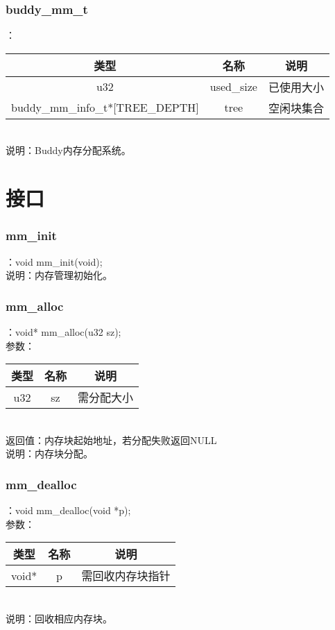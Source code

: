 \subsubsection{buddy\_mm\_t}
：\\
\begin{tabular}{|c|c|c|}
    \hline
    类型 & 名称 & 说明\\\hline
    u32 & used\_size & 已使用大小\\\hline
    buddy\_mm\_info\_t*[TREE\_DEPTH] & tree & 空闲块集合\\\hline
\end{tabular}\\
说明：Buddy内存分配系统。

\section{接口}

\subsubsection{mm\_init}
：void mm\_init(void);\\
说明：内存管理初始化。

\subsubsection{mm\_alloc}
：void* mm\_alloc(u32 sz);\\
参数：\\
\begin{tabular}{|c|c|c|}
    \hline
    类型 & 名称 & 说明\\\hline
    u32 & sz & 需分配大小\\\hline
\end{tabular}\\
返回值：内存块起始地址，若分配失败返回NULL\\
说明：内存块分配。

\subsubsection{mm\_dealloc}
：void mm\_dealloc(void *p);\\
参数：\\
\begin{tabular}{|c|c|c|}
    \hline
    类型 & 名称 & 说明\\\hline
    void* & p & 需回收内存块指针\\\hline
\end{tabular}\\
说明：回收相应内存块。
